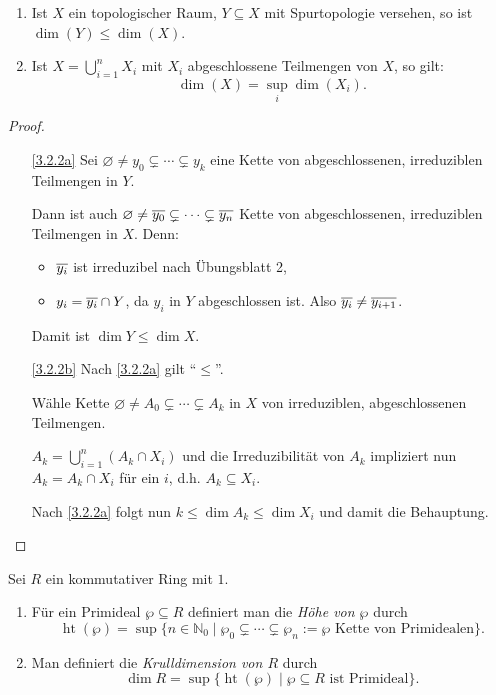 \documentclass[a4paper,12pt,index=toc]{scrbook}
\theoremstyle{keinenummern} %
\newcommand{\hoehe}{\operatorname{ht}}
\newcommand{\leer}{\ensuremath{\varnothing}}
\newcommand{\set}[1]{\ensuremath{\mathbb{#1}}}
\newcommand{\N}{\set{N}}
\def\Bar#1{\ensuremath\overline{#1}}
\begin{document}
\begin{bem}\label{3.2.2}
\begin{enumerate}
  \item{} Ist $X$ ein topologischer Raum, $Y\subseteq X$ mit Spurtopologie versehen, so ist $\dim(Y) \le \dim(X)$.
  \item{} Ist $X=\bigcup\limits_{i=1}^{n} X_i$ mit $X_i$ abgeschlossene Teilmengen von $X$, so gilt: 
  \[\dim(X)=\sup_{i} \dim(X_i).\]
\end{enumerate}
\end{bem}

\begin{proof}
  \begin{enumerate}
  \item[\ref{3.2.2a}] Sei $\leer \neq y_0 \subsetneq \dotsm \subsetneq y_k$ eine Kette von abgeschlossenen, irreduziblen Teilmengen in $Y$.

Dann ist auch $\leer \neq \Bar{y_0} \subsetneq \dotsm \subsetneq \Bar{y_n}$ Kette von abgeschlossenen, irreduziblen Teilmengen in $X$. Denn:
  \begin{itemize}
     \item $\Bar{y_i}$ ist irreduzibel nach Übungsblatt 2,
     \item $y_i=\Bar{y_i} \cap Y$, da $y_i$ in $Y$ abgeschlossen ist. Also $\Bar{y_i}\neq \Bar{y_{i+1}}$.
   \end{itemize}
Damit ist $\dim Y\le \dim X$.  
  \item[\ref{3.2.2b}] Nach \ref{3.2.2a} gilt \enquote{$\le$}.

Wähle Kette $\leer \neq A_0 \subsetneq \dotsm \subsetneq A_k$ in $X$ von irreduziblen, abgeschlossenen Teilmengen.

$A_k=\bigcup\limits_{i=1}^{n} (A_k \cap X_i)$ und die Irreduzibilität von $A_k$ impliziert nun $A_k=A_k \cap X_i$ für ein $i$, d.h. $A_k\subseteq X_i$.

Nach \ref{3.2.2a} folgt nun $k \le \dim A_k \le \dim X_i$ und damit die Behauptung.
 \end{enumerate}
\end{proof}

\begin{erinnerung}\label{3.2.3}
Sei $R$ ein kommutativer Ring mit $1$.
  \begin{enumerate}
  \item{} Für ein Primideal $\wp \subseteq R$ definiert man die \emph{Höhe von $\wp$} durch
  \[ \hoehe(\wp)=\sup \{n\in \N_0 \mid \wp_0 \subsetneq \dotsm \subsetneq \wp_n:=\wp \text{ Kette von Primidealen}\}.\]
  \item{} Man definiert die \emph{Krulldimension von $R$} durch
  \[\dim R=\sup\{\hoehe(\wp) \mid \wp \subseteq R \text { ist Primideal}\}.\] 
  \end{enumerate}
\end{erinnerung}
\end{document}
